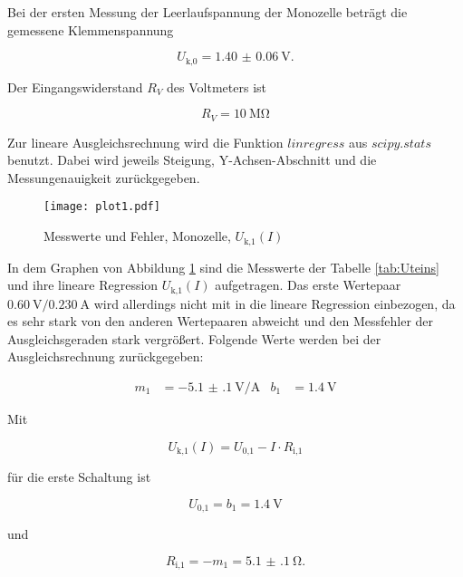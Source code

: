   Bei der ersten Messung der Leerlaufspannung der Monozelle beträgt die
  gemessene Klemmenspannung

  \begin{equation}
    U_\text{k,0} = \SI{1.40(6)}{\V}.
  \end{equation}

  Der Eingangswiderstand $R_V$ des Voltmeters ist

  \begin{equation}
    R_V = \SI{10}{\mega\ohm}
  \end{equation}

  Zur lineare Ausgleichsrechnung wird die Funktion $linregress$ aus $scipy.stats$
  benutzt. Dabei wird jeweils Steigung, Y-Achsen-Abschnitt und die
  Messungenauigkeit zurückgegeben.

  \newpage

  \begin{figure}[h]
    \centering
    \texttt{[image: plot1.pdf]}
    \caption{Messwerte und Fehler, Monozelle,  $U_\text{k,1}(I)$}
    \label{fig:Ueins}
  \end{figure}

  In dem Graphen von Abbildung \ref{fig:Ueins} sind die Messwerte der Tabelle
  \ref{tab:Uteins} und ihre lineare Regression
  $U_\text{k,1}(I)$ aufgetragen.
  Das erste Wertepaar $\SI{0.60}{\V}/ \SI{0.230}{\A}$
  wird allerdings nicht mit in die lineare Regression einbezogen,
  da es sehr stark von den anderen Wertepaaren abweicht und
  den Messfehler der Ausgleichsgeraden stark vergrößert.
  Folgende Werte werden bei der Ausgleichsrechnung zurückgegeben:

  \begin{align}
    m_1 & = \SI{-5.1(1)}{\V\per\A} & b_1 & = \SI{1.4}{\V}
  \end{align}

  Mit

  \begin{equation}
    U_\text{k,1}(I) = U_\text{0,1} - I \cdot R_\text{i,1}
  \end{equation}

  für die erste Schaltung ist

  \begin{equation}
    U_\text{0,1} = b_1 = \SI{1.4}{\V}
  \end{equation}

  und

  \begin{equation}
    R_\text{i,1} = -m_1 = \SI{5.1(1)}{\ohm}.
  \end{equation}

